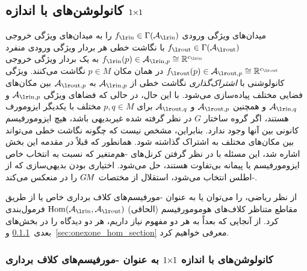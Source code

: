 

\subsection[\texorpdfstring{کانولوشن‌های \lr{GM} با اندازه ${1\kern-2.7pt\times\kern-2.9pt1}$}{1x1} ]%
         {کانولوشن‌های  با اندازه \texorpdfstring{${1\kern-2.7pt\times\kern-2.9pt1}$}{1x1}}
\label{sec:onexone}


\onexoneGMsfarsi میدان‌های ویژگی ورودی $\fin\in\Gamma(\Ain)$ را به میدان‌های ویژگی خروجی $\fout\in\Gamma(\Aout)$ با نگاشت خطی هر بردار ویژگی ورودی منفرد $\fin(p)\in\Ainp\cong\R^{\cin}$ به یک بردار ویژگی خروجی $\fout(p)\in\Aoutp\cong\R^{\cout}$ در همان مکان $p\in M$ نگاشت می‌کنند.
ویژگی کانولوشنی با \emph{اشتراک‌گذاری} نگاشت خطی از $\Ainp$ به $\Aoutp$ بین مکان‌های فضایی مختلف پیاده‌سازی می‌شود.
با این حال، در حالی که فضاهای ویژگی $\Ainp$ و $\Ainq$ و همچنین $\Aoutp$ و $\Aoutq$ برای $p,q\in M$ مختلف با یکدیگر ایزومورف هستند، اگر گروه ساختار $G$ در نظر گرفته شده غیربدیهی باشد، هیچ ایزومورفیسم کانونی بین آنها وجود ندارد.
بنابراین، مشخص نیست که چگونه نگاشت خطی می‌تواند بین مکان‌های مختلف به اشتراک گذاشته شود.
همانطور که قبلاً در مقدمه این بخش اشاره شد، این مسئله با در نظر گرفتن کرنل‌های -هم‌متغیر که نسبت به انتخاب خاص ایزومورفیسم یا پیمانه بی‌تفاوت هستند، حل می‌شود.
اختیاری بودن بدیهی‌سازی که از -اطلس انتخاب می‌شود، استقلال از مختصات $G\mkern-1.4muM$ را در \onexoneGMsfarsi منعکس می‌کند.


از نظر ریاضی، \onexoneGMsfarsi را می‌توان یا به عنوان -مورفیسم‌های کلاف برداری خاص یا از طریق مقاطع متناظر کلاف‌های هومومورفیسم (الحاقی) $\Hom(\Ain,\Aout)$ فرمول‌بندی کرد.
از آنجایی که بعداً به هر دو مفهوم نیاز داریم، هر دو دیدگاه را در بخش‌های بعدی~\ref{sec:onexone_M_morphism} و~\ref{sec:onexone_hom_section} معرفی خواهیم کرد.


\subsubsection[\texorpdfstring{کانولوشن‌های \lr{GM} با اندازه ${1\kern-2.7pt\times\kern-2.9pt1}$}{1x1} به عنوان \lr{M}-مورفیسم‌های کلاف برداری]%
          {کانولوشن‌های  با اندازه \texorpdfstring{${1\kern-2.7pt\times\kern-2.9pt1}$}{1x1} به عنوان -مورفیسم‌های کلاف برداری}
\label{sec:onexone_M_morphism}


